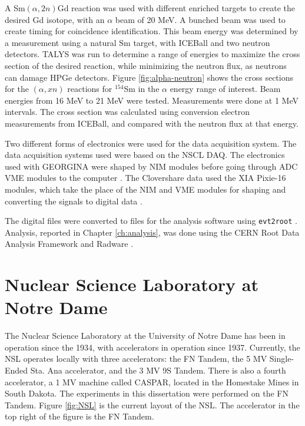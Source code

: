 A Sm$(\alpha,2n)$Gd reaction was used with different enriched targets to create the desired Gd isotope, with an $\alpha$ beam of 20 MeV. A bunched beam was used to create timing for coincidence identification. This beam energy was determined by a measurement using a natural Sm target, with ICEBall and two neutron detectors. TALYS was run to determine a range of energies to maximize the cross section of the desired reaction, while minimizing the neutron flux, as neutrons can damage HPGe detectors. Figure \ref{fig:alpha-neutron} shows the cross sections for the $(\alpha,xn)$ reactions for $^{154}$Sm in the $\alpha$ energy range of interest. Beam energies from 16 MeV to 21 MeV were tested. Measurements were done at 1 MeV intervals. The cross section was calculated using conversion electron measurements from ICEBall, and compared with the neutron flux at that energy.



Two different forms of electronics were used for the data acquisition system. The data acquisition systems used were based on the NSCL DAQ\citep{nscl:_daq,prokop14:_nsclddas}. The electronics used with GEORGINA were shaped by NIM modules before going through ADC VME modules to the computer \citep{mesytec:_ADC,caen:_TDC}. The Clovershare data used the XIA Pixie-16 modules, which take the place of the NIM and VME modules for shaping and converting the signals to digital data \citep{xia:_pixie}.

The digital files were converted to files for the analysis software using \texttt{evt2root} \citep{smith14:_evt2root}. Analysis, reported in Chapter \ref{ch:analysis}, was done using the CERN Root Data Analysis Framework and Radware \citep{brun97:_root,radford00:_radware}.

\section{Nuclear Science Laboratory at Notre Dame}

The Nuclear Science Laboratory at the University of Notre Dame has been in operation since the 1934, with accelerators in operation since 1937. Currently, the NSL operates locally with three accelerators: the FN Tandem, the 5 MV Single-Ended Sta. Ana accelerator, and the 3 MV 9S Tandem. There is also a fourth accelerator, a 1 MV machine called CASPAR, located in the Homestake Mines in South Dakota. The experiments in this dissertation were performed on the FN Tandem. Figure \ref{fig:NSL} is the current layout of the NSL. The accelerator in the top right of the figure is the FN Tandem.

